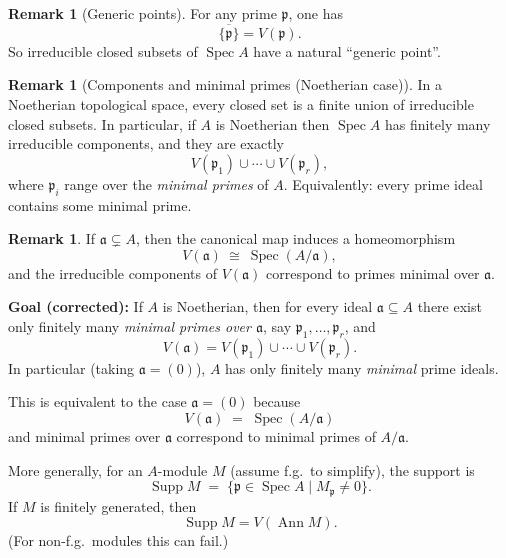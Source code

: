 \documentclass[11pt,a4paper]{article}
\theoremstyle{definition}
\newtheorem{remark}[definition]{Remark}
\theoremstyle{plain}
\theoremstyle{remark}
\newcommand{\Ann}{\operatorname{Ann}}
\newcommand{\Spec}{\operatorname{Spec}}
\newcommand{\Supp}{\operatorname{Supp}}
\begin{document}
\begin{remark}[Generic points]
For any prime $\mathfrak p$, one has
\[
\overline{\{\mathfrak p\}} = V(\mathfrak p).
\]
So irreducible closed subsets of $\Spec A$ have a natural “generic point”.
\end{remark}

\begin{remark}[Components and minimal primes (Noetherian case)]
In a Noetherian topological space, every closed set is a finite union of irreducible closed subsets.
In particular, if $A$ is Noetherian then $\Spec A$ has finitely many irreducible components, and they are exactly
\[
V(\mathfrak p_1)\cup\cdots\cup V(\mathfrak p_r),
\]
where $\mathfrak p_i$ range over the \emph{minimal primes} of $A$.
Equivalently: every prime ideal contains some minimal prime.
\end{remark}

\begin{remark}
If $\mathfrak a\subsetneq A$, then the canonical map induces a homeomorphism
\[
V(\mathfrak a)\ \cong\ \Spec(A/\mathfrak a),
\]
and the irreducible components of $V(\mathfrak a)$ correspond to primes minimal over $\mathfrak a$.
\end{remark}

\textbf{Goal (corrected):}
If $A$ is Noetherian, then for every ideal $\mathfrak a \subseteq A$ there exist only finitely many
\emph{minimal primes over $\mathfrak a$}, say $\mathfrak p_1,\dots,\mathfrak p_r$, and
\[
V(\mathfrak a)=V(\mathfrak p_1)\cup\cdots\cup V(\mathfrak p_r).
\]
In particular (taking $\mathfrak a=(0)$), $A$ has only finitely many \emph{minimal} prime ideals.

This is equivalent to the case $\mathfrak a=(0)$ because
\[
V(\mathfrak a)\;=\;\Spec(A/\mathfrak a)
\]
and minimal primes over $\mathfrak a$ correspond to minimal primes of $A/\mathfrak a$.

\bigskip

More generally, for an $A$-module $M$ (assume f.g.\ to simplify), the support is
\[
\Supp M \;=\;\{\mathfrak p\in\Spec A \mid M_{\mathfrak p}\neq 0\}.
\]
If $M$ is finitely generated, then
\[
\Supp M = V(\Ann M).
\]
(For non-f.g.\ modules this can fail.)
\end{document}
